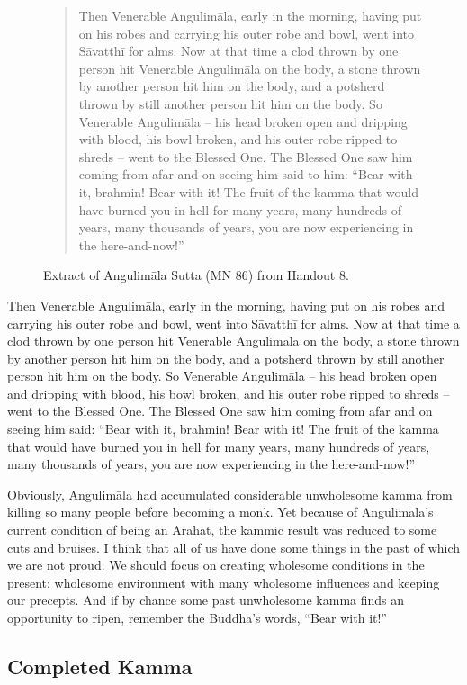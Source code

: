 \begin{figure}[H]
\begin{quotation}
Then Venerable Angulimāla, early in the morning, having put on his robes and carrying his outer robe and bowl, went into Sāvatthī for alms. Now at that time a clod thrown by one person hit Venerable Angulimāla on the body, a stone thrown by another person hit him on the body, and a potsherd thrown by still another person hit him on the body. So Venerable Angulimāla – his head broken open and dripping with blood, his bowl broken, and his outer robe ripped to shreds – went to the Blessed One. The Blessed One saw him coming from afar and on seeing him said to him: “Bear with it, brahmin! Bear with it! The fruit of the kamma that would have burned you in hell for many years, many hundreds of years, many thousands of years, you are now experiencing in the here-and-now!”
\end{quotation}
\caption{Extract of Angulimāla Sutta (MN 86) from Handout 8.}
\label{fig:MN86}
\end{figure}

Then Venerable Angulimāla, early in the morning, having put on his robes and carrying his outer robe and bowl, went into Sāvatthī for alms. Now at that time a clod thrown by one person hit Venerable Angulimāla on the body, a stone thrown by another person hit him on the body, and a potsherd thrown by still another person hit him on the body. So Venerable Angulimāla – his head broken open and dripping with blood, his bowl broken, and his outer robe ripped to shreds – went to the Blessed One. The Blessed One saw him coming from afar and on seeing him said: “Bear with it, brahmin! Bear with it! The fruit of the kamma that would have burned you in hell for many years, many hundreds of years, many thousands of years, you are now experiencing in the here-and-now!”

Obviously, Angulimāla had accumulated considerable unwholesome kamma from killing so many people before becoming a monk. Yet because of Angulimāla’s current condition of being an Arahat, the kammic result was reduced to some cuts and bruises. I think that all of us have done some things in the past of which we are not proud. We should focus on creating wholesome conditions in the present; wholesome environment with many wholesome influences and keeping our precepts. And if by chance some past unwholesome kamma finds an opportunity to ripen, remember the Buddha’s words, “Bear with it!”

\subsection*{Completed Kamma}

